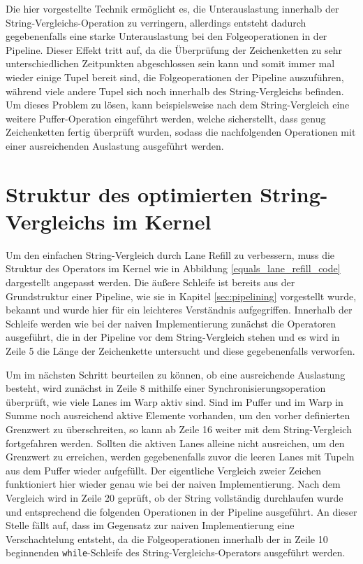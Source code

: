 Die hier vorgestellte Technik ermöglicht es, die Unterauslastung innerhalb der String-Vergleichs-Operation zu verringern, allerdings entsteht dadurch gegebenenfalls eine starke Unterauslastung bei den Folgeoperationen in der Pipeline.
Dieser Effekt tritt auf, da die Überprüfung der Zeichenketten zu sehr unterschiedlichen Zeitpunkten abgeschlossen sein kann und somit immer mal wieder einige Tupel bereit sind, die Folgeoperationen der Pipeline auszuführen, während viele andere Tupel sich noch innerhalb des String-Vergleichs befinden.
Um dieses Problem zu lösen, kann beispielsweise nach dem String-Vergleich eine weitere Puffer-Operation eingeführt werden, welche sicherstellt, dass genug Zeichenketten fertig überprüft wurden, sodass die nachfolgenden Operationen mit einer ausreichenden Auslastung ausgeführt werden.

\section{Struktur des optimierten String-Vergleichs im Kernel}

Um den einfachen String-Vergleich durch Lane Refill zu verbessern, muss die Struktur des Operators im Kernel wie in Abbildung \ref{equals_lane_refill_code} dargestellt angepasst werden.
Die äußere Schleife ist bereits aus der Grundstruktur einer Pipeline, wie sie in Kapitel \ref{sec:pipelining} vorgestellt wurde, bekannt und wurde hier für ein leichteres Verständnis aufgegriffen.
Innerhalb der Schleife werden wie bei der naiven Implementierung zunächst die Operatoren ausgeführt, die in der Pipeline vor dem String-Vergleich stehen und es wird in Zeile 5 die Länge der Zeichenkette untersucht und diese gegebenenfalls verworfen.

Um im nächsten Schritt beurteilen zu können, ob eine ausreichende Auslastung besteht, wird zunächst in Zeile 8 mithilfe einer Synchronisierungsoperation überprüft, wie viele Lanes im Warp aktiv sind.
Sind im Puffer und im Warp in Summe noch ausreichend aktive Elemente vorhanden, um den vorher definierten Grenzwert zu überschreiten, so kann ab Zeile 16 weiter mit dem String-Vergleich fortgefahren werden.
Sollten die aktiven Lanes alleine nicht ausreichen, um den Grenzwert zu erreichen, werden gegebenenfalls zuvor die leeren Lanes mit Tupeln aus dem Puffer wieder aufgefüllt.
Der eigentliche Vergleich zweier Zeichen funktioniert hier wieder genau wie bei der naiven Implementierung.
Nach dem Vergleich wird in Zeile 20 geprüft, ob der String vollständig durchlaufen wurde und entsprechend die folgenden Operationen in der Pipeline ausgeführt.
An dieser Stelle fällt auf, dass im Gegensatz zur naiven Implementierung eine Verschachtelung entsteht, da die Folgeoperationen innerhalb der in Zeile 10 beginnenden \texttt{while}-Schleife des String-Vergleichs-Operators ausgeführt werden.

